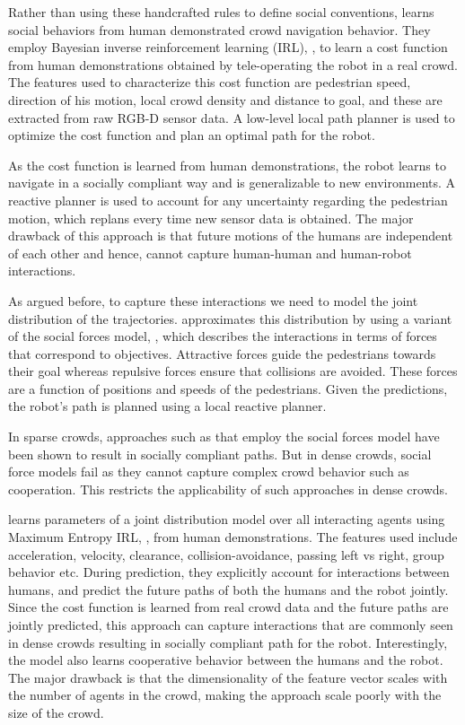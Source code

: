 Rather than using these handcrafted rules to define social conventions, \cite{kim2016socially} learns social behaviors from human demonstrated crowd navigation behavior. They employ Bayesian inverse reinforcement learning (IRL), \cite{Ramachandran2007BayesianIR}, to learn a cost function from human demonstrations obtained by tele-operating the robot in a real crowd. The features used to characterize this cost function are pedestrian speed, direction of his motion, local crowd density and distance to goal, and these are extracted from raw RGB-D sensor data. A low-level local path planner is used to optimize the cost function and plan an optimal path for the robot.

As the cost function is learned from human demonstrations, the robot learns to navigate in a socially compliant way and is generalizable to new environments. A reactive planner is used to account for any uncertainty regarding the pedestrian motion, which replans every time new sensor data is obtained. The major drawback of this approach is that future motions of the humans are independent of each other and hence, cannot capture human-human and human-robot interactions.

As argued before, to capture these interactions we need to model the joint distribution of the trajectories. \cite{shiomi2014towards} approximates this distribution by using a variant of the social forces model, \cite{helbing95}, which describes the interactions in terms of forces that correspond to objectives. Attractive forces guide the pedestrians towards their goal whereas repulsive forces ensure that collisions are avoided. These forces are a function of positions and speeds of the pedestrians. Given the predictions, the robot's path is planned using a local reactive planner.

In sparse crowds, approaches such as \cite{shiomi2014towards} that employ the social forces model have been shown to result in socially compliant paths. But in dense crowds, social force models fail as they cannot capture complex crowd behavior such as cooperation. This restricts the applicability of such approaches in dense crowds.

\cite{Kretzschmar16} learns parameters of a joint distribution model over all interacting agents using Maximum Entropy IRL, \cite{Ziebart2008MaximumEI}, from human demonstrations. The features used include acceleration, velocity, clearance, collision-avoidance, passing left vs right, group behavior etc. During prediction, they explicitly account for interactions between humans, and predict the future paths of both the humans and the robot jointly. Since the cost function is learned from real crowd data and the future paths are jointly predicted, this approach can capture interactions that are commonly seen in dense crowds resulting in socially compliant path for the robot. Interestingly, the model also learns cooperative behavior between the humans and the robot. The major drawback is that the dimensionality of the feature vector scales with the number of agents in the crowd, making the approach scale poorly with the size of the crowd.

